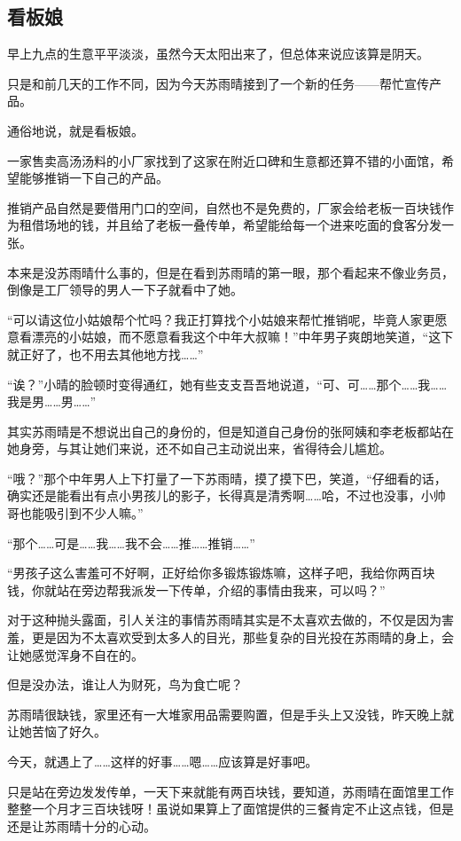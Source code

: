 \subsection{看板娘}

早上九点的生意平平淡淡，虽然今天太阳出来了，但总体来说应该算是阴天。

只是和前几天的工作不同，因为今天苏雨晴接到了一个新的任务——帮忙宣传产品。

通俗地说，就是看板娘。

一家售卖高汤汤料的小厂家找到了这家在附近口碑和生意都还算不错的小面馆，希望能够推销一下自己的产品。

推销产品自然是要借用门口的空间，自然也不是免费的，厂家会给老板一百块钱作为租借场地的钱，并且给了老板一叠传单，希望能给每一个进来吃面的食客分发一张。

本来是没苏雨晴什么事的，但是在看到苏雨晴的第一眼，那个看起来不像业务员，倒像是工厂领导的男人一下子就看中了她。

“可以请这位小姑娘帮个忙吗？我正打算找个小姑娘来帮忙推销呢，毕竟人家更愿意看漂亮的小姑娘，而不愿意看我这个中年大叔嘛！”中年男子爽朗地笑道，“这下就正好了，也不用去其他地方找……”

“诶？”小晴的脸顿时变得通红，她有些支支吾吾地说道，“可、可……那个……我……我是男……男……”

其实苏雨晴是不想说出自己的身份的，但是知道自己身份的张阿姨和李老板都站在她身旁，与其让她们来说，还不如自己主动说出来，省得待会儿尴尬。

“哦？”那个中年男人上下打量了一下苏雨晴，摸了摸下巴，笑道，“仔细看的话，确实还是能看出有点小男孩儿的影子，长得真是清秀啊……哈，不过也没事，小帅哥也能吸引到不少人嘛。”

“那个……可是……我……我不会……推……推销……”

“男孩子这么害羞可不好啊，正好给你多锻炼锻炼嘛，这样子吧，我给你两百块钱，你就站在旁边帮我派发一下传单，介绍的事情由我来，可以吗？”

对于这种抛头露面，引人关注的事情苏雨晴其实是不太喜欢去做的，不仅是因为害羞，更是因为不太喜欢受到太多人的目光，那些复杂的目光投在苏雨晴的身上，会让她感觉浑身不自在的。

但是没办法，谁让人为财死，鸟为食亡呢？

苏雨晴很缺钱，家里还有一大堆家用品需要购置，但是手头上又没钱，昨天晚上就让她苦恼了好久。

今天，就遇上了……这样的好事……嗯……应该算是好事吧。

只是站在旁边发发传单，一天下来就能有两百块钱，要知道，苏雨晴在面馆里工作整整一个月才三百块钱呀！虽说如果算上了面馆提供的三餐肯定不止这点钱，但是还是让苏雨晴十分的心动。

